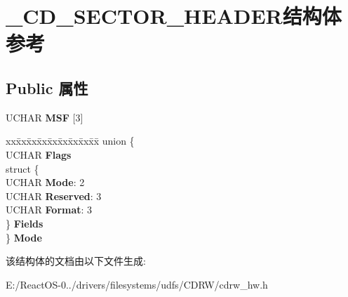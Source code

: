 \hypertarget{struct___c_d___s_e_c_t_o_r___h_e_a_d_e_r}{}\section{\+\_\+\+C\+D\+\_\+\+S\+E\+C\+T\+O\+R\+\_\+\+H\+E\+A\+D\+E\+R结构体 参考}
\label{struct___c_d___s_e_c_t_o_r___h_e_a_d_e_r}
\subsection*{Public 属性}
\begin{DoxyCompactItemize}
\item 
\mbox{\label{struct___c_d___s_e_c_t_o_r___h_e_a_d_e_r_a5605a4fb996fcd46d10428af23b6eac1}} 
U\+C\+H\+AR {\bfseries M\+SF} \mbox{[}3\mbox{]}
\item 
\mbox{\label{struct___c_d___s_e_c_t_o_r___h_e_a_d_e_r_acef7a4d1011e240a7813b43ed1bb5209}} 
\begin{tabbing}
xx\=xx\=xx\=xx\=xx\=xx\=xx\=xx\=xx\=\kill
union \{\\
\>UCHAR {\bfseries Flags}\\
\>struct \{\\
\>\>UCHAR {\bfseries Mode}: 2\\
\>\>UCHAR {\bfseries Reserved}: 3\\
\>\>UCHAR {\bfseries Format}: 3\\
\>\} {\bfseries Fields}\\
\} {\bfseries Mode}\\

\end{tabbing}\end{DoxyCompactItemize}


该结构体的文档由以下文件生成\+:\begin{DoxyCompactItemize}
\item 
E\+:/\+React\+O\+S-\/0../drivers/filesystems/udfs/\+C\+D\+R\+W/cdrw\+\_\+hw.\+h\end{DoxyCompactItemize}

